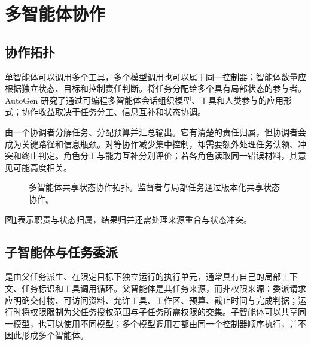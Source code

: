 \documentclass[../textbook.tex]{subfiles}
\begin{document}
\section{多智能体协作}
\optional
\subsection{协作拓扑}
单智能体可以调用多个工具，多个模型调用也可以属于同一控制器；智能体数量应根据独立状态、目标和控制责任判断。将任务分配给多个具有局部状态的参与者。AutoGen 研究了通过可编程多智能体会话组织模型、工具和人类参与的应用形式\cite{wu2023autogen}；协作收益取决于任务分工、信息互补和状态协调。

由一个协调者分解任务、分配预算并汇总输出。它有清楚的责任归属，但协调者会成为关键路径和信息瓶颈。对等协作减少集中控制，却需要额外处理任务认领、冲突和终止判定。角色分工与能力互补分别评价；若各角色读取同一错误材料，其意见可能高度相关。

\begin{figure}[htbp]
\centering
{}
\caption[多智能体共享状态协作拓扑]{多智能体共享状态协作拓扑。监督者与局部任务通过版本化共享状态协作。}\label{fig:agent-supervisor}
\end{figure}

图\ref{fig:agent-supervisor}表示职责与状态归属，结果归并还需处理来源重合与状态冲突。

\subsection{子智能体与任务委派}
是由父任务派生、在限定目标下独立运行的执行单元，通常具有自己的局部上下文、任务标识和工具调用循环。父智能体是其任务来源，而非权限来源：委派请求应明确交付物、可访问资料、允许工具、工作区、预算、截止时间与完成判据；运行时将权限限制为父任务授权范围与子任务所需权限的交集。子智能体可以共享同一模型，也可以使用不同模型；多个模型调用若都由同一个控制器顺序执行，并不因此形成多个智能体。
\end{document}
